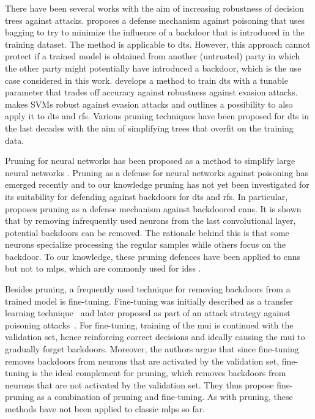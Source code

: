 \documentclass[10pt,sigconf,letterpaper,dvipsnames]{acmart}
\newcommand\note[2]{{\color{#1}#2}}
\newcommand\todo[1]{{\note{red}{TODO: #1}}}
\begin{document}
There have been several works with the aim of increasing robustness of decision trees against attacks. \cite{biggio_bagging_2011} proposes a defense mechanism against poisoning that uses bagging to try to minimize the influence of a backdoor that is introduced in the training dataset. The method is applicable to \glspl{dt}. However, this approach cannot protect if a trained model is obtained from another (untrusted) party in which the other party might potentially have introduced a backdoor, which is the use case considered in this work. \cite{chen_robust_2019} develops a method to train \glspl{dt} with a tunable parameter that trades off accuracy against robustness against evasion attacks. \cite{russu_secure_2016} makes SVMs robust against evasion attacks and outlines a possibility to also apply it to \glspl{dt} and \glspl{rf}.
Various pruning techniques have been proposed for \glspl{dt} in the last decades \cite{esposito_comparative_1997} with the aim of simplifying trees that overfit on the training data. 

Pruning for neural networks has been proposed
as a method to simplify large neural networks \cite{sietsma_neural_1988}.
Pruning as a defense for neural networks against poisoning has emerged recently \cite{gu_badnets:_2017} and to our knowledge pruning has not yet been investigated for its suitability for defending against backdoors for \glspl{dt} and \glspl{rf}.
In particular, \cite{gu_badnets:_2017} proposes pruning as a defense mechanism against backdoored \glspl{cnn}. It is shown that by removing infrequently used neurons from the last convolutional layer, potential backdoors can be removed. The rationale behind this is that some neurons specialize processing the regular samples while others focus on the backdoor.
To our knowledge, these pruning defences have been applied to \glspl{cnn} but not to \glspl{mlp}, which are commonly used for \glspl{ids} \cite{meghdouri_analysis_2018}. 

Besides pruning, a frequently used technique for removing backdoors from a trained model is fine-tuning. Fine-tuning was initially described as a transfer learning technique~\cite{yosinski_how_2014} and later proposed as part of an attack strategy against poisoning attacks~\cite{liu_fine-pruning:_2018}. For fine-tuning, training of the \gls{mui} is continued with the validation set, hence reinforcing correct decisions and ideally causing the \gls{mui} to gradually forget backdoors. Moreover, the authors argue that since fine-tuning removes backdoors from neurons that are activated by the validation set, fine-tuning is the ideal complement for pruning, which removes backdoors from neurons that are not activated by the validation set. They thus propose fine-pruning as a combination of pruning and fine-tuning. As with pruning, these methods have not been applied to classic \glspl{mlp} so far.
\end{document}
